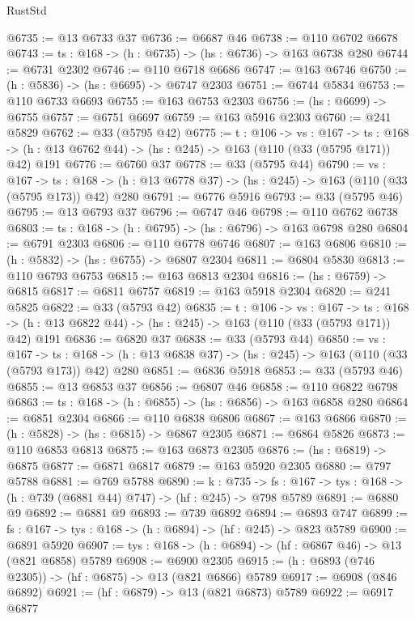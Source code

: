 \begin{lexlean}{RustStd}
\begin{coremodule}
@6735 := @13 @6733 @37
@6736 := @6687 @46
@6738 := @110 @6702 @6678
@6743 := {ts : @168} -> (h : @6735) -> (hs : @6736) -> @163 @6738 @280
@6744 := @6731 @2302
@6746 := @110 @6718 @6686
@6747 := @163 @6746
@6750 := (h : @5836) -> (hs : @6695) -> @6747 @2303
@6751 := @6744 @5834
@6753 := @110 @6733 @6693
@6755 := @163 @6753 @2303
@6756 := (hs : @6699) -> @6755
@6757 := @6751 @6697
@6759 := @163 @5916 @2303
@6760 := @241 @5829
@6762 := @33 (@5795 @42)
@6775 := {t : @106} ->
  {vs : @167} ->
  {ts : @168} -> (h : @13 @6762 @44) -> (hs : @245) -> @163 (@110 (@33 (@5795 @171)) @42) @191
@6776 := @6760 @37
@6778 := @33 (@5795 @44)
@6790 := {vs : @167} ->
  {ts : @168} -> (h : @13 @6778 @37) -> (hs : @245) -> @163 (@110 (@33 (@5795 @173)) @42) @280
@6791 := @6776 @5916
@6793 := @33 (@5795 @46)
@6795 := @13 @6793 @37
@6796 := @6747 @46
@6798 := @110 @6762 @6738
@6803 := {ts : @168} -> (h : @6795) -> (hs : @6796) -> @163 @6798 @280
@6804 := @6791 @2303
@6806 := @110 @6778 @6746
@6807 := @163 @6806
@6810 := (h : @5832) -> (hs : @6755) -> @6807 @2304
@6811 := @6804 @5830
@6813 := @110 @6793 @6753
@6815 := @163 @6813 @2304
@6816 := (hs : @6759) -> @6815
@6817 := @6811 @6757
@6819 := @163 @5918 @2304
@6820 := @241 @5825
@6822 := @33 (@5793 @42)
@6835 := {t : @106} ->
  {vs : @167} ->
  {ts : @168} -> (h : @13 @6822 @44) -> (hs : @245) -> @163 (@110 (@33 (@5793 @171)) @42) @191
@6836 := @6820 @37
@6838 := @33 (@5793 @44)
@6850 := {vs : @167} ->
  {ts : @168} -> (h : @13 @6838 @37) -> (hs : @245) -> @163 (@110 (@33 (@5793 @173)) @42) @280
@6851 := @6836 @5918
@6853 := @33 (@5793 @46)
@6855 := @13 @6853 @37
@6856 := @6807 @46
@6858 := @110 @6822 @6798
@6863 := {ts : @168} -> (h : @6855) -> (hs : @6856) -> @163 @6858 @280
@6864 := @6851 @2304
@6866 := @110 @6838 @6806
@6867 := @163 @6866
@6870 := (h : @5828) -> (hs : @6815) -> @6867 @2305
@6871 := @6864 @5826
@6873 := @110 @6853 @6813
@6875 := @163 @6873 @2305
@6876 := (hs : @6819) -> @6875
@6877 := @6871 @6817
@6879 := @163 @5920 @2305
@6880 := @797 @5788
@6881 := @769 @5788
@6890 := {k : @735} ->
  {fs : @167} -> {tys : @168} -> (h : @739 (@6881 @44) @747) -> (hf : @245) -> @798 @5789
@6891 := @6880 @9
@6892 := @6881 @9
@6893 := @739 @6892
@6894 := @6893 @747
@6899 := {fs : @167} -> {tys : @168} -> (h : @6894) -> (hf : @245) -> @823 @5789
@6900 := @6891 @5920
@6907 := {tys : @168} -> (h : @6894) -> (hf : @6867 @46) -> @13 (@821 @6858) @5789
@6908 := @6900 @2305
@6915 := (h : @6893 (@746 @2305)) -> (hf : @6875) -> @13 (@821 @6866) @5789
@6917 := @6908 (@846 @6892)
@6921 := (hf : @6879) -> @13 (@821 @6873) @5789
@6922 := @6917 @6877

\end{coremodule}
\end{lexlean}
